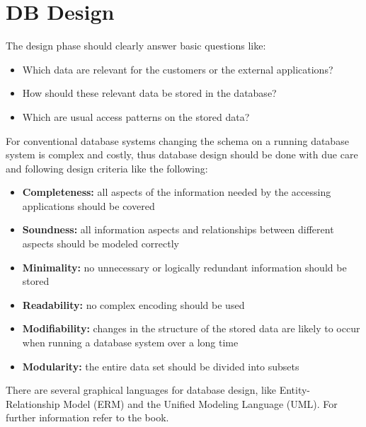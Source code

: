 \section{DB Design}
The design phase should clearly answer basic questions like:
\begin{itemize}
    \item Which data are relevant for the customers or the external applications?
    \item How should these relevant data be stored in the database? 
    \item Which are usual access patterns on the stored data?
\end{itemize}
For conventional database systems changing the schema on a running database system is complex and costly, thus database design should be done with due care and following design criteria like the following:
\begin{itemize}
    \item \textbf{Completeness:} all aspects of the information needed by the accessing applications should be covered
    \item \textbf{Soundness:} all information aspects and relationships between different aspects should be modeled correctly
    \item \textbf{Minimality:} no unnecessary or logically redundant information should be stored
    \item \textbf{Readability:} no complex encoding should be used
    \item \textbf{Modifiability:} changes in the structure of the stored data are likely to occur when running a database system over a long time
    \item \textbf{Modularity:} the entire data set should be divided into subsets
\end{itemize}
There are several graphical languages for database design, like Entity-Relationship Model (ERM) and the Unified Modeling Language (UML). For further information refer to the book.